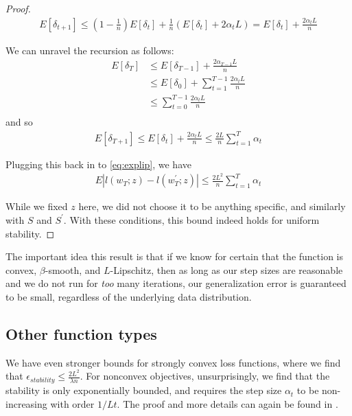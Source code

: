 \documentclass[12pt]{report}
\begin{document}
\begin{proof}
\begin{align}
E[\delta_{t+1}] \leq \left(1- \frac{1}{n}\right) E[\delta_t] + \frac{1}{n} (E[\delta_t] + 2\alpha_t L) = E[\delta_t] + \frac{2\alpha_t L}{n}
\end{align}

We can unravel the recursion as follows:
\begin{align}
E[\delta_T] &\leq E[\delta_{T-1}] + \frac{2\alpha_{T-1}L}{n} \\
&\leq E[\delta_0] + \sum_{t=1}^{T-1} \frac{2\alpha_{t}L}{n} \\
&\leq \sum_{t=0}^{T-1} \frac{2\alpha_{t}L}{n} \\
\end{align}
and so
\begin{align}
E[\delta_{T+1}] \leq E[\delta_t] + \frac{2\alpha_tL}{n} \leq \frac{2L}{n}\sum_{t=1}^T \alpha_t
\end{align}

Plugging this back in to \ref{eq:explip}, we have
\begin{align}
E |l(w_T;z) - l(w_T^\prime;z)| \leq \frac{2L^2}{n} \sum_{t=1}^T \alpha_t
\end{align}

While we fixed $z$ here, we did not choose it to be anything specific, and similarly with $S$ and $S^\prime$. With these conditions, this bound indeed holds for uniform stability.

\end{proof}

The important idea this result is that if we know for certain that the function is convex, $\beta$-smooth, and $L$-Lipschitz, then as long as our step sizes are reasonable and we do not run for \textit{too} many iterations, our generalization error is guaranteed to be small, regardless of the underlying data distribution.

\subsection{Other function types}

We have even stronger bounds for strongly convex loss functions, where we find that $\epsilon_{stability} \leq \frac{2L^2}{\lambda n}$. For nonconvex objectives, unsurprisingly, we find that the stability is only exponentially bounded, and requires the step size $\alpha_t$ to be non-increasing with order $1/Lt$. The proof and more details can again be found in \cite{hardt2015train}. 
\end{document}
